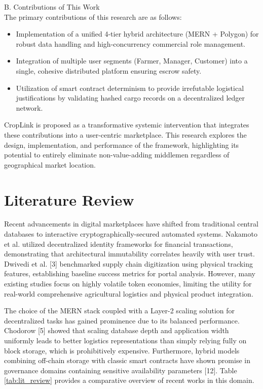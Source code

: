 \documentclass[conference]{IEEEtran}
\begin{document}
B. Contributions of This Work\\
The primary contributions of this research are as follows:
\begin{itemize}
    \item Implementation of a unified 4-tier hybrid architecture (MERN + Polygon) for robust data handling and high-concurrency commercial role management.
    \item Integration of multiple user segments (Farmer, Manager, Customer) into a single, cohesive distributed platform ensuring escrow safety.
    \item Utilization of smart contract determinism to provide irrefutable logistical justifications by validating hashed cargo records on a decentralized ledger network.
\end{itemize}

CropLink is proposed as a transformative systemic intervention that integrates these contributions into a user-centric marketplace. This research explores the design, implementation, and performance of the framework, highlighting its potential to entirely eliminate non-value-adding middlemen regardless of geographical market location.

\section{Literature Review}
Recent advancements in digital marketplaces have shifted from traditional central databases to interactive cryptographically-secured automated systems. Nakamoto et al. utilized decentralized identity frameworks for financial transactions, demonstrating that architectural immutability correlates heavily with user trust. Dwivedi et al. [3] benchmarked supply chain digitization using physical tracking features, establishing baseline success metrics for portal analysis. However, many existing studies focus on highly volatile token economies, limiting the utility for real-world comprehensive agricultural logistics and physical product integration.

The choice of the MERN stack coupled with a Layer-2 scaling solution for decentralized tasks has gained prominence due to its balanced performance. Chodorow [5] showed that scaling database depth and application width uniformly leads to better logistics representations than simply relying fully on block storage, which is prohibitively expensive. Furthermore, hybrid models combining off-chain storage with classic smart contracts have shown promise in governance domains containing sensitive availability parameters [12]. Table \ref{tab:lit_review} provides a comparative overview of recent works in this domain.
\end{document}
